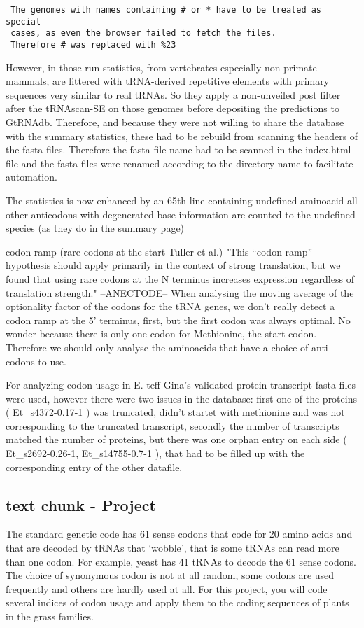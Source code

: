 \begin{verbatim}
 The genomes with names containing # or * have to be treated as special 
 cases, as even the browser failed to fetch the files. 
 Therefore # was replaced with %23
\end{verbatim}

However, in those run statistics, from vertebrates especially non-primate mammals, are littered with tRNA-derived repetitive elements with primary sequences very similar to real tRNAs. So they apply a non-unveiled post filter after the tRNAscan-SE on those genomes before depositing the predictions to GtRNAdb. Therefore, and because they were not willing to share the database with the summary statistics, these had to be rebuild from scanning the headers of the fasta files. Therefore the fasta file name had to be scanned in the index.html file and the fasta files were renamed according to the directory name to facilitate automation. 

The statistics is now enhanced by an 65th line containing undefined aminoacid all other anticodons with degenerated base information are counted to the undefined species (as they do in the summary page)

codon ramp (rare codons at the start Tuller et al.) "This “codon ramp” hypothesis should apply primarily in the context of strong translation, but we found that using rare codons at the N terminus increases expression regardless of translation strength." --ANECTODE-- When analysing the moving average of the optionality factor of the codons for the tRNA genes, we don't really detect a codon ramp at the 5' terminus, first, but the first codon was always optimal. No wonder because there is only one codon for Methionine, the start codon. Therefore we should only analyse the aminoacids that have a choice of anti-codons to use.  

For analyzing codon usage in E. teff Gina's validated protein-transcript fasta files were used, however there were two issues in the database: 
first one of the proteins (
Et\_s4372-0.17-1
) was truncated, didn't startet with methionine and was not corresponding to the truncated transcript, secondly the number of transcripts matched the number of proteins, but there was one orphan entry on each side (
Et\_s2692-0.26-1, Et\_s14755-0.7-1
), that had to be filled up with the corresponding entry of the other datafile. 


\subsection{text chunk - Project}
The standard genetic code has 61 sense codons that code for 20 amino acids and that are decoded by 
tRNAs that ‘wobble’, that is some tRNAs can read more than one codon. For example, yeast has 41 
tRNAs to decode the 61 sense codons. The choice of synonymous codon is not at all random, some 
codons are used frequently and others are hardly used at all. For this project, you will code several 
indices of codon usage and apply them to the coding sequences of plants in the grass families. 


